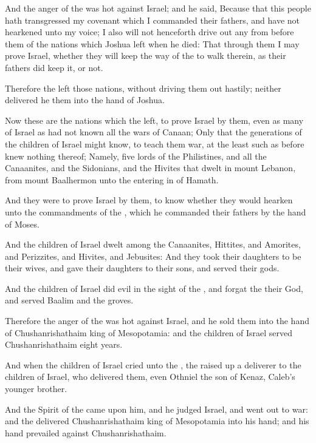 \Verse And the anger of the \LORD was hot against Israel; and he said, Because that this people hath transgressed my covenant which I commanded their fathers, and have not hearkened unto my voice; \Verse I also will not henceforth drive out any from before them of the nations which Joshua left when he died: \Verse That through them I may prove Israel, whether they will keep the way of the \LORD to walk therein, as their fathers did keep it, or not.

\Verse Therefore the \LORD left those nations, without driving them out hastily; neither delivered he them into the hand of Joshua.


\Chapter
\Verse Now these are the nations which the \LORD left, to prove Israel by them, even as many of Israel as had not known all the wars of Canaan; \Verse Only that the generations of the children of Israel might know, to teach them war, at the least such as before knew nothing thereof; \Verse Namely, five lords of the Philistines, and all the Canaanites, and the Sidonians, and the Hivites that dwelt in mount Lebanon, from mount Baalhermon unto the entering in of Hamath.

\Verse And they were to prove Israel by them, to know whether they would hearken unto the commandments of the \LORD, which he commanded their fathers by the hand of Moses.

\Verse And the children of Israel dwelt among the Canaanites, Hittites, and Amorites, and Perizzites, and Hivites, and Jebusites: \Verse And they took their daughters to be their wives, and gave their daughters to their sons, and served their gods.

\Verse And the children of Israel did evil in the sight of the \LORD, and forgat the \LORD their God, and served Baalim and the groves.

\Verse Therefore the anger of the \LORD was hot against Israel, and he sold them into the hand of Chushanrishathaim king of Mesopotamia: and the children of Israel served Chushanrishathaim eight years.

\Verse And when the children of Israel cried unto the \LORD, the \LORD raised up a deliverer to the children of Israel, who delivered them, even Othniel the son of Kenaz, Caleb's younger brother.

\Verse And the Spirit of the \LORD came upon him, and he judged Israel, and went out to war: and the \LORD delivered Chushanrishathaim king of Mesopotamia into his hand; and his hand prevailed against Chushanrishathaim.

